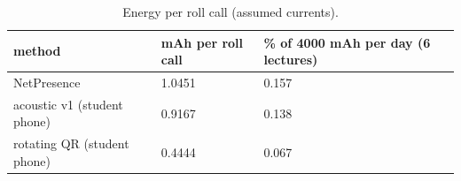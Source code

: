 \begin{table}[t]
\centering
\caption{Energy per roll call (assumed currents).}\label{tab:e14}
\begin{tabular}{lll}
\toprule
method & mAh per roll call & \% of 4000 mAh per day (6 lectures) \\
\midrule
NetPresence & 1.0451 & 0.157 \\
acoustic v1 (student phone) & 0.9167 & 0.138 \\
rotating QR (student phone) & 0.4444 & 0.067 \\
\bottomrule
\end{tabular}
\end{table}
